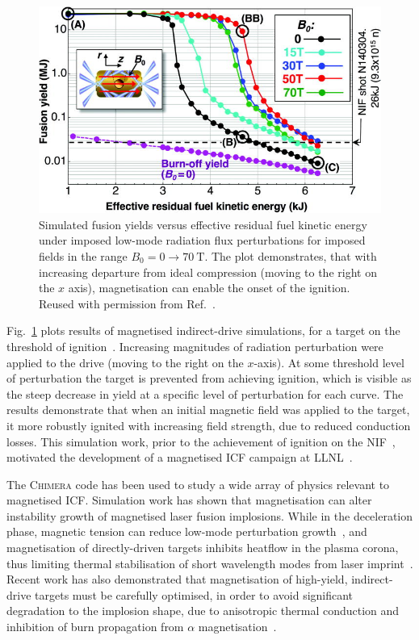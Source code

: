 \begin{figure}[t!]
    \includegraphics[width=0.75\linewidth]{Results2/Images/magicf_perkins.jpeg}
    \centering
    \caption{Simulated fusion yields versus effective residual fuel kinetic energy under imposed low-mode radiation flux perturbations for imposed fields in the range $B_0=0\rightarrow70\ \text{T}$.
    The plot demonstrates, that with increasing departure from ideal compression (moving to the right on the $x$ axis), magnetisation can enable the onset of the ignition.
    Reused with permission from Ref.~\cite{perkins_potential_2017}.}%
    \label{fig:Res2_perkins_magicf}
\end{figure}

Fig.~\ref{fig:Res2_perkins_magicf} plots results of magnetised indirect-drive simulations, for a target on the threshold of ignition~\cite{perkins_potential_2017}.
Increasing magnitudes of radiation perturbation were applied to the drive (moving to the right on the $x$-axis).
At some threshold level of perturbation the target is prevented from achieving ignition, which is visible as the steep decrease in yield at a specific level of perturbation for each curve.
The results demonstrate that when an initial magnetic field was applied to the target, it more robustly ignited with increasing field strength, due to reduced conduction losses.
This simulation work, prior to the achievement of ignition on the \ac{NIF}~\cite{zylstra_burning_2022}, motivated the development of a magnetised \ac{ICF} campaign at \ac{LLNL}~\cite{moody_magnetized_2022}.

The \textsc{Chimera} code has been used to study a wide array of physics relevant to magnetised \ac{ICF}.
Simulation work has shown that magnetisation can alter instability growth of magnetised laser fusion implosions.
While in the deceleration phase, magnetic tension can reduce low-mode perturbation growth~\cite{walsh_perturbation_2019}, and magnetisation of directly-driven targets inhibits heatflow in the plasma corona, thus limiting thermal stabilisation of short wavelength modes from laser imprint~\cite{walsh_magnetized_2020}.
Recent work has also demonstrated that magnetisation of high-yield, indirect-drive targets must be carefully optimised, in order to avoid significant degradation to the implosion shape, due to anisotropic thermal conduction and inhibition of burn propagation from $\alpha$ magnetisation~\cite{oneill_modelling_2023}.

